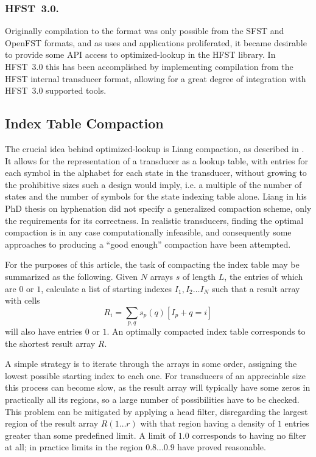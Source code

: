 \documentclass{llncs}
\begin{document}
\subsubsection{HFST~3.0.}
Originally compilation to the format was only possible from the SFST and OpenFST
formats, and as uses and applications proliferated, it became desirable to
provide some API access to optimized-lookup in the HFST library. In HFST~3.0
this has been accomplished by implementing compilation from the HFST internal
transducer format, allowing for a great degree of integration with
HFST~3.0 supported tools.

\subsection{Index Table Compaction}
The crucial idea behind optimized-lookup is Liang compaction, as described in
\cite{silfverberg/2009}. It allows for the representation of a transducer as
a lookup table, with entries for each symbol in the alphabet for each state
in the transducer, without growing to the prohibitive sizes such a design
would imply, i.e. a multiple of the number of states and the number of symbols for
the state indexing table alone. Liang in his PhD thesis on hyphenation
\cite{liang/1983} did not specify a generalized compaction scheme, only the
requirements for its correctness. In realistic transducers, finding the optimal
compaction is in any case computationally infeasible, and consequently some approaches to
producing a ``good enough'' compaction have been attempted.

For the purposes of this article, the task of compacting the index table may
be summarized as the following. Given $N$ arrays $s$ of length $L$, the
entries of which are $0$ or $1$, calculate a list of starting indexes
$I_1, I_2 \ldots I_N$ such that a result array with cells
\begin{equation}
R_i = \displaystyle\sum\limits_{p, q} s_p(q) [I_p + q = i]
\end{equation} will also have
entries $0$ or $1$. An optimally compacted index table corresponds to the
shortest result array $R$.

A simple strategy is to iterate through the arrays in some order, assigning
the lowest possible starting index to each one. For transducers of an
appreciable size this process can become slow, as the result array
will typically have some zeros in practically all its regions, so a large
number of possibilities have to be checked. This problem can be mitigated by
applying a head filter, disregarding the largest region of the result array
$R(1 \ldots r)$ with that region having a density of $1$ entries greater than
some predefined limit. A limit of $1.0$ corresponds to having no filter at all;
in practice limits in the region $0.8 \ldots 0.9$ have proved reasonable.
\end{document}
